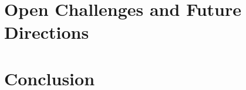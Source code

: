 \documentclass[journal]{IEEEtran}
\begin{document}
\section{Open Challenges and Future Directions}
\label{sec:challenges}

\section{Conclusion}
\label{sec:conclusion}



\end{document}

